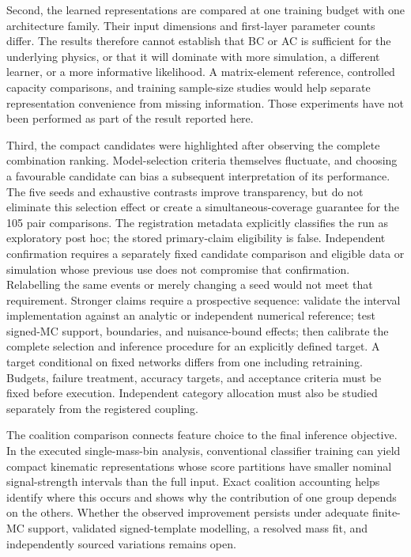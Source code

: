 \documentclass[aps,prd,reprint,superscriptaddress,nofootinbib,longbibliography,floatfix]{revtex4-2}
\begin{document}
Second, the learned representations are compared at one training budget
with one architecture family. Their input dimensions and first-layer
parameter counts differ. The results therefore cannot establish that BC
or AC is sufficient for the underlying physics, or that it will dominate
with more simulation, a different learner, or a more informative likelihood.
A matrix-element reference, controlled capacity comparisons, and training
sample-size studies would help separate representation convenience from
missing information. Those experiments have not been performed as part of
the result reported here.

Third, the compact candidates were highlighted after observing the complete
combination ranking. Model-selection criteria themselves fluctuate, and
choosing a favourable candidate can bias a subsequent interpretation of its
performance\cite{Cawley2010}. The five seeds and exhaustive contrasts improve
transparency, but do not eliminate this selection effect or create a
simultaneous-coverage guarantee for the 105 pair comparisons. The
registration metadata explicitly classifies the run as exploratory post hoc;
the stored primary-claim eligibility is false. Independent
confirmation requires a separately fixed candidate comparison and eligible
data or simulation whose previous use does not compromise that confirmation.
Relabelling the same events or merely changing a seed would not meet that
requirement.
Stronger claims require a prospective sequence: validate the interval
implementation against an analytic or independent numerical reference;
test signed-MC support, boundaries, and nuisance-bound effects; then
calibrate the complete selection and inference procedure for an explicitly
defined target. A target conditional on fixed networks differs from one
including retraining. Budgets, failure treatment, accuracy targets, and
acceptance criteria must be fixed before execution. Independent category
allocation must also be studied separately from the registered coupling.

The coalition comparison connects feature choice to the final inference
objective. In the executed
single-mass-bin analysis, conventional classifier training can yield compact
kinematic representations whose score partitions have smaller nominal
signal-strength intervals than the full input. Exact coalition accounting
helps identify where this occurs and shows why the contribution of one
group depends on the others. Whether the observed improvement persists
under adequate finite-MC support, validated signed-template modelling, a
resolved mass fit, and independently sourced variations remains open.
\end{document}
